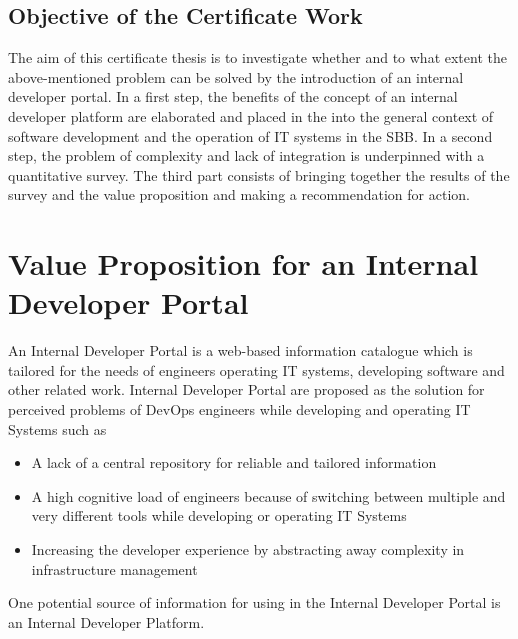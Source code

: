\documentclass[a4paper,12pt]{article}
\begin{document}
    \subsection{Objective of the Certificate Work}
    \label{subsec:iobjective}
    The aim of this certificate thesis is to investigate whether and to what extent the above-mentioned problem
    can be solved by the introduction of an internal developer portal.
    In a first step, the benefits of the concept of an internal developer platform are elaborated and placed in the
    into the general context of software development and the operation of IT systems in the SBB.
    In a second step, the problem of complexity and lack of integration is underpinned with a quantitative survey.
    The third part consists of bringing together the results of the survey and the value proposition and making a
    recommendation for action.


    \section{Value Proposition for an Internal Developer Portal}
    \label{sec:vp}
    An Internal Developer Portal is a web-based information catalogue which is tailored for the needs of
    engineers operating IT systems, developing software and other related work.
    Internal Developer Portal are proposed as the solution for perceived problems\parencite{backstagestory} of DevOps
    engineers while developing and operating IT Systems such as
    \begin{itemize}
        \item A lack of a central repository for reliable and tailored information
        \item A high cognitive load of engineers because of switching between multiple and very different tools while developing or operating IT Systems
        \item Increasing the developer experience by abstracting away complexity in infrastructure management
    \end{itemize}
    One potential source of information for using in the Internal Developer Portal is an Internal Developer Platform.
\end{document}
